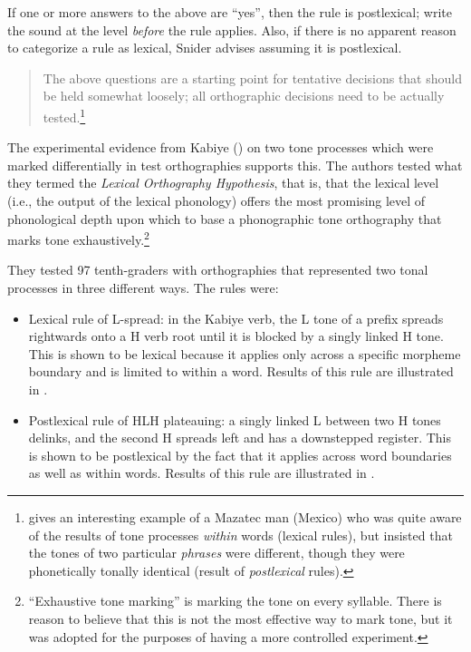 \documentclass[output=paper]{langscibook}
\begin{document}
If one or more answers to the above are “yes”, then the rule is postlexical; write the sound at the level \textit{before} the rule applies. Also, if there is no apparent reason to categorize a rule as lexical, Snider advises assuming it is postlexical.

    \begin{quote}
      The above questions are a starting point for tentative decisions that should be held somewhat loosely; all orthographic decisions need to be actually tested.\footnote{\citet[342-343]{Gudschinsky1958} gives an interesting example of a Mazatec man (Mexico) who was quite aware of the results of tone processes \textit{within} words (lexical rules), but insisted that the tones of two particular \textit{phrases} were different, though they were phonetically tonally identical (result of \textit{postlexical} rules).}
    \end{quote}
    
The experimental evidence from Kabiye (\citealt{Roberts2016neither}) on two tone processes which were marked differentially in test orthographies supports this. The authors tested what they termed the \textit{Lexical Orthography Hypothesis}, that is, that the lexical level (i.e., the output of the lexical phonology) offers the most promising level of phonological depth upon which to base a phonographic tone orthography that marks tone exhaustively.\footnote{“Exhaustive tone marking” is marking the tone on every syllable. There is reason to believe that this is not the most effective way to mark tone, but it was adopted for the purposes of having a more controlled experiment.}

They tested 97 tenth-graders with orthographies that represented two tonal processes in three different ways. The rules were:

\begin{itemize}
    \item Lexical rule of L-spread: in the Kabiye verb, the L tone of a prefix spreads rightwards onto a H verb root until it is blocked by a singly linked H tone. This is shown to be lexical because it applies only across a specific morpheme boundary and is limited to within a word. Results of this rule are illustrated in .
    \item Postlexical rule of HLH plateauing: a singly linked L between two H tones delinks, and the second H spreads left and has a downstepped register. This is shown to be postlexical by the fact that it applies across word boundaries as well as within words. Results of this rule are illustrated in .
\end{itemize}
\end{document}
